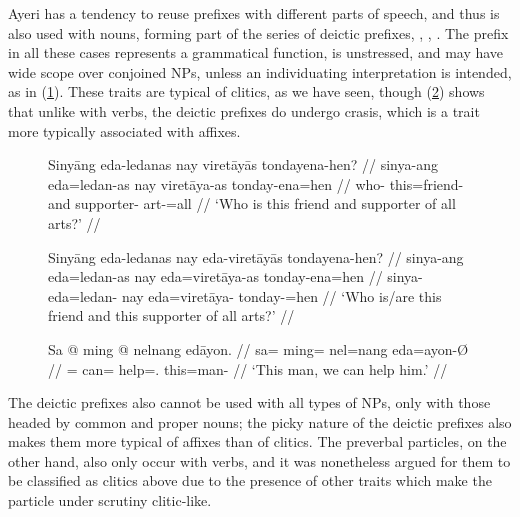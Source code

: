 \label{clitics_prenoun_dem}
Ayeri has a tendency to reuse prefixes with different parts of speech, and thus
 is also used with nouns, forming part of the series of deictic
prefixes, , ,
. The prefix in all these cases represents a grammatical
function, is unstressed, and may have wide scope over conjoined NPs, unless an
individuating interpretation is intended, as in (\ref{ex:clitics_21b}). These
traits are typical of clitics, as we have seen, though (\ref{ex:clitics_22})
shows that unlike with verbs, the deictic prefixes do undergo crasis, which is
a trait more typically associated with affixes.

\begin{figure}
\pex\label{ex:clitics_21}
\a\label{ex:clitics_21a}\begingl
	\gla Sinyāng eda-ledanas nay viretāyās tondayena-hen? //
	\glb sinya-ang eda=ledan-as nay viretāya-as tonday-ena=hen //
	\glc who-\Aarg{} this=friend-\Parg{} and supporter-\Parg{} 
		art-\Gen{}=all //
	\glft `Who is this friend and supporter of all arts?' //
\endgl

\a\label{ex:clitics_21b}\begingl
	\gla Sinyāng eda-ledanas nay eda-viretāyās tondayena-hen? //
	\glb sinya-ang eda=ledan-as nay eda=viretāya-as tonday-ena=hen //
	\glc sinya-\Aarg{} eda=ledan-\Parg{} nay eda=viretāya-\Parg{} 
		tonday-\Gen{}=hen //
	\glft `Who is/are this friend and this supporter of all arts?' //
\endgl
\xe
\end{figure}

\begin{figure}
\ex\label{ex:clitics_22}\begingl
	\gla Sa @ ming @ nelnang edāyon. //
	\glb sa= ming= nel=nang eda=ayon-Ø //
	\glc \Parg{}= can= help=\Fpl{}.\Aarg{} this=man-\Top{} //
	\glft `This man, we can help him.' //
\endgl\xe
\end{figure}

The deictic prefixes also cannot be used with all types of NPs, only with those
headed by common and proper nouns; the picky nature of the deictic prefixes
also makes them more typical of affixes than of clitics. The preverbal
particles, on the other hand, also only occur with verbs, and it was
nonetheless argued for them to be classified as clitics above due to the
presence of other traits which make the particle under scrutiny clitic-like.

